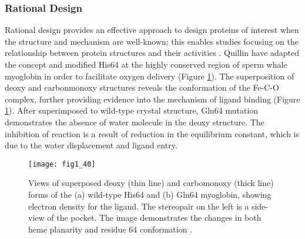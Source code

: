 \begin{refsection}
\subsubsection{Rational Design}
\label{sec:rational-design}

Rational design provides an effective approach to design proteins of interest
when the structure and mechanism are well-known; this enables studies focusing on
the relationship between protein structures and their activities
\cite{Beadle2002a,Quillin1993}. Quillin  have adapted the concept
and modified His64 at the highly conserved region of sperm whale myoglobin in
order to facilitate oxygen delivery \cite{Quillin1993} (Figure
\ref{fig:myoglobin}). The superposition of deoxy and carbonmonoxy structures
reveals the conformation of the Fe-C-O complex, further providing evidence
into the mechanism of ligand binding \cite{Quillin1993} (Figure
\ref{fig:myoglobin}). After superimposed to wild-type crystal structure, Gln64
mutation demonstrates the absence of water molecule in the deoxy structure. The
inhibition of reaction is a result of reduction in the equilibrium constant,
which is due to the water displacement and ligand entry. 
\begin{figure}[htbp] \centering \texttt{[image: fig1\_40]}
    \caption[Views of superposed deoxy (thin line) and carbomonoxy (thick
        line) forms of the (a) wild-type His64 and (b) Gln64 myoglobin, showing
        electron density for the ligand. The stereopair on the left is a
        side-view of the pocket. The image demonstrates the changes in both
        heme planarity and residue 64 conformation.]{Views of superposed deoxy
            (thin line) and carbomonoxy (thick line) forms of the (a) wild-type
            His64 and (b) Gln64 myoglobin, showing electron density for the
            ligand.  The stereopair on the left is a side-view of the pocket.
            The image demonstrates the changes in both heme planarity and
            residue 64 conformation \cite{Quillin1993}.} \label{fig:myoglobin}
\end{figure}


\end{refsection}
